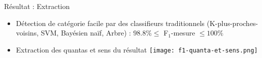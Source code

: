 \begin{frame}[c]{Résultat : Extraction}
	\begin{itemize} \small
		\item Détection de catégorie facile par des classifieurs traditionnels (K-plus-proches-voisins, SVM, Bayésien naïf, Arbre) : $98.8\% \leq$ F$_1$-mesure $\leq 100\%$
		\item Extraction des quantas et sens du résultat
			\texttt{[image: f1-quanta-et-sens.png]}
	\end{itemize}
\end{frame}
